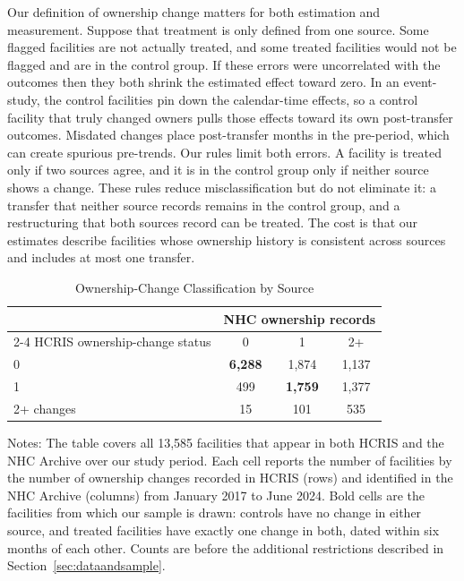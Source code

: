 \documentclass[12pt]{article}
\begin{document}
Our definition of ownership change matters for both estimation and measurement. Suppose that treatment is only defined from one source. Some flagged facilities are not actually treated, and some treated facilities would not be flagged and are in the control group. If these errors were uncorrelated with the outcomes then they both shrink the estimated effect toward zero. In an event-study, the control facilities pin down the calendar-time effects, so a control facility that truly changed owners pulls those effects toward its own post-transfer outcomes. Misdated changes place post-transfer months in the pre-period, which can create spurious pre-trends. Our rules limit both errors. A facility is treated only if two sources agree, and it is in the control group only if neither source shows a change. These rules reduce misclassification but do not eliminate it: a transfer that neither source records remains in the control group, and a restructuring that both sources record can be treated. The cost is that our estimates describe facilities whose ownership history is consistent across sources and includes at most one transfer.

\begin{table}[!htbp]
\centering
\caption{Ownership-Change Classification by Source}
\label{tab:ownership-classification-sample}

\begin{threeparttable}
\small
\begin{tabularx}{\textwidth}{lccc}
\toprule
& \multicolumn{3}{c}{NHC ownership records} \\
\cmidrule(lr){2-4}
HCRIS ownership-change status 
& 0 
& 1 
& 2+ \\
\midrule
0          & \textbf{6,288} & 1,874 & 1,137 \\
1          & 499 & \textbf{1,759} & 1,377 \\
2+ changes & 15 & 101 & 535 \\
\bottomrule
\end{tabularx}

\begin{tablenotes}
\footnotesize
\item Notes: The table covers all 13,585 facilities that appear in both HCRIS and the NHC Archive over our study period. Each cell reports the number of facilities by the number of ownership changes recorded in HCRIS (rows) and identified in the NHC Archive (columns) from January 2017 to June 2024. Bold cells are the facilities from which our sample is drawn: controls have no change in either source, and treated facilities have exactly one change in both, dated within six months of each other. Counts are before the additional restrictions described in Section~\ref{sec:dataandsample}.
\end{tablenotes}

\end{threeparttable}
\end{table}
\end{document}
